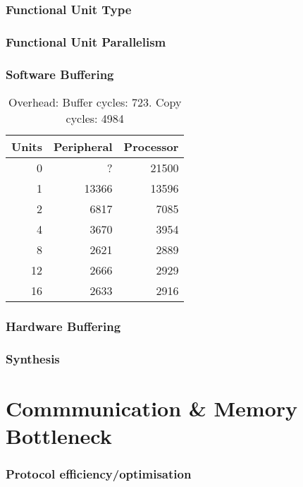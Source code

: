 \documentclass[a4paper,8pt]{report}
\begin{document}
\subsection{Functional Unit Type}

\subsection{Functional Unit Parallelism}

\subsection{Software Buffering}
\begin{table}
  \centering
  \begin{tabular}{r|rr}
    \toprule
    Units & Peripheral & Processor\\
    \midrule
    0  &     ? & 21500 \\
    1  & 13366 & 13596 \\
    2  &  6817 &  7085 \\
    4  &  3670 &  3954 \\
    8  &  2621 &  2889 \\
    12 &  2666 &  2929 \\
    16 &  2633 &  2916 \\
    \bottomrule
  \end{tabular}
  \caption{Overhead: Buffer cycles: 723. Copy cycles: 4984}
\end{table}

\subsection{Hardware Buffering}

\subsection{Synthesis}



\chapter{Commmunication \& Memory Bottleneck}
\subsection{Protocol efficiency/optimisation}
\end{document}
